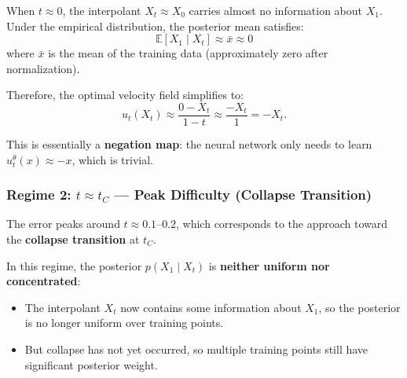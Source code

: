 \documentclass[11pt]{article}
\begin{document}
When $t \approx 0$, the interpolant $X_t \approx X_0$ carries almost no information about $X_1$. Under the empirical distribution, the posterior mean satisfies:
\begin{equation}
\mathbb{E}[X_1 \mid X_t] \approx \bar{x} \approx 0
\end{equation}
where $\bar{x}$ is the mean of the training data (approximately zero after normalization).

Therefore, the optimal velocity field simplifies to:
\begin{equation}
u_t(X_t) \approx \frac{0 - X_t}{1-t} \approx \frac{-X_t}{1} = -X_t.
\end{equation}

This is essentially a \textbf{negation map}: the neural network only needs to learn $u^\theta_t(x) \approx -x$, which is trivial.

\subsubsection{Regime 2: $t \approx t_C$ --- Peak Difficulty (Collapse Transition)}
The error peaks around $t \approx 0.1$--$0.2$, which corresponds to the approach toward the \textbf{collapse transition} at $t_C$.

In this regime, the posterior $p(X_1 \mid X_t)$ is \textbf{neither uniform nor concentrated}:
\begin{itemize}
\item The interpolant $X_t$ now contains some information about $X_1$, so the posterior is no longer uniform over training points.
\item But collapse has not yet occurred, so multiple training points still have significant posterior weight.
\end{itemize}
\end{document}
